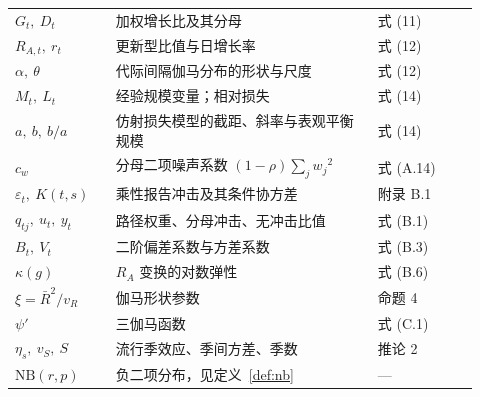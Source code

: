 \documentclass[fontset=none,11pt,a4paper,fleqn]{ctexart}
\numberwithin{equation}{section}
\theoremstyle{zhthm}
\theoremstyle{zhrem}
\newcommand{\Rbar}{\bar R}
\newcommand{\NB}{\mathrm{NB}}
\begin{document}
\begin{longtable}{@{}p{0.2\linewidth}p{0.52\linewidth}p{0.2\linewidth}@{}}
$G_t,\ D_t$ & 加权增长比及其分母 & 式 (11) \\
$R_{A,t},\ r_t$ & 更新型比值与日增长率 & 式 (12) \\
$\alpha,\ \theta$ & 代际间隔伽马分布的形状与尺度 & 式 (12) \\
$M_t,\ L_t$ & 经验规模变量；相对损失 & 式 (14) \\
$a,\ b,\ b/a$ & 仿射损失模型的截距、斜率与表观平衡规模 & 式 (14) \\
$c_w$ & 分母二项噪声系数 $(1-\rho)\sum_j{w_j}^2$ & 式 (A.14) \\
$\varepsilon_t,\ K(t,s)$ & 乘性报告冲击及其条件协方差 & 附录 B.1 \\
$q_{tj},\ u_t,\ y_t$ & 路径权重、分母冲击、无冲击比值 & 式 (B.1) \\
$B_t,\ V_t$ & 二阶偏差系数与方差系数 & 式 (B.3) \\
$\kappa(g)$ & $R_A$ 变换的对数弹性 & 式 (B.6) \\
$\xi=\Rbar^2/v_R$ & 伽马形状参数 & 命题 4 \\
$\psi'$ & 三伽马函数 & 式 (C.1) \\
$\eta_s,\ v_S,\ S$ & 流行季效应、季间方差、季数 & 推论 2 \\
$\NB(r,p)$ & 负二项分布，见定义~\ref{def:nb} & --- \\
\end{longtable}
\end{document}
